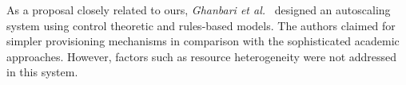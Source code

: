 As a proposal closely related to ours, \emph{Ghanbari et al.}~\cite{ghanbari_exploring_2011} designed an autoscaling system using control theoretic and rules-based models. The authors claimed for simpler provisioning mechanisms in comparison with the sophisticated academic approaches. However, factors such as resource heterogeneity were not addressed in this system.  












